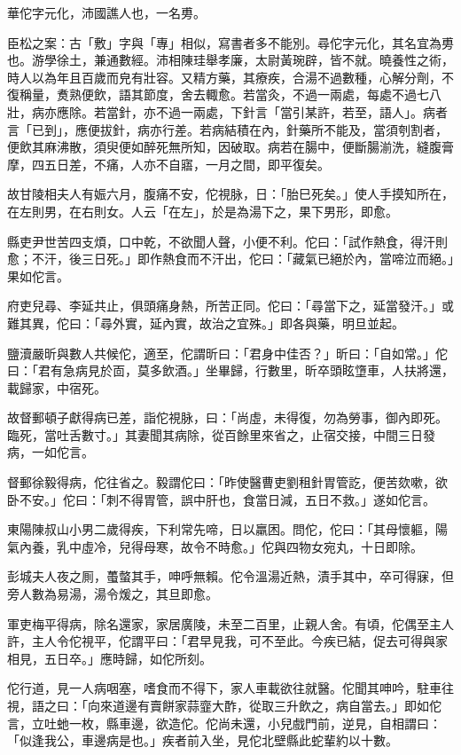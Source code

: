 
\begin{pinyinscope}
華佗字元化，沛國譙人也，一名旉。

臣松之案：古「敷」字與「專」相似，寫書者多不能別。尋佗字元化，其名宜為旉也。游學徐土，兼通數經。沛相陳珪舉孝廉，太尉黃琬辟，皆不就。曉養性之術，時人以為年且百歲而皃有壯容。又精方藥，其療疾，合湯不過數種，心解分劑，不復稱量，煑熟便飲，語其節度，舍去輙愈。若當灸，不過一兩處，每處不過七八壯，病亦應除。若當針，亦不過一兩處，下針言「當引某許，若至，語人」。病者言「已到」，應便拔針，病亦行差。若病結積在內，針藥所不能及，當須刳割者，便飲其麻沸散，須臾便如醉死無所知，因破取。病若在腸中，便斷腸湔洗，縫腹膏摩，四五日差，不痛，人亦不自寤，一月之間，即平復矣。

故甘陵相夫人有娠六月，腹痛不安，佗視脉，日：「胎巳死矣。」使人手摸知所在，在左則男，在右則女。人云「在左」，於是為湯下之，果下男形，即愈。

縣吏尹世苦四支煩，口中乾，不欲聞人聲，小便不利。佗曰：「試作熱食，得汗則愈；不汗，後三日死。」即作熱食而不汗出，佗曰：「藏氣已絕於內，當啼泣而絕。」果如佗言。

府吏兒尋、李延共止，俱頭痛身熱，所苦正同。佗曰：「尋當下之，延當發汗。」或難其異，佗曰：「尋外實，延內實，故治之宜殊。」即各與藥，明旦並起。

鹽瀆嚴昕與數人共候佗，適至，佗謂昕曰：「君身中佳否？」昕曰：「自如常。」佗曰：「君有急病見於靣，莫多飲酒。」坐畢歸，行數里，昕卒頭眩墯車，人扶將還，載歸家，中宿死。

故督郵頓子獻得病已差，詣佗視脉，曰：「尚虛，未得復，勿為勞事，御內即死。臨死，當吐舌數寸。」其妻聞其病除，從百餘里來省之，止宿交接，中間三日發病，一如佗言。

督郵徐毅得病，佗往省之。毅謂佗曰：「昨使醫曹吏劉租針胃管訖，便苦欬嗽，欲卧不安。」佗曰：「刺不得胃管，誤中肝也，食當日減，五日不救。」遂如佗言。

東陽陳叔山小男二歲得疾，下利常先啼，日以羸困。問佗，佗曰：「其母懷軀，陽氣內養，乳中虛冷，兒得母寒，故令不時愈。」佗與四物女宛丸，十日即除。

彭城夫人夜之厠，蠆螫其手，呻呼無賴。佗令溫湯近熱，漬手其中，卒可得寐，但旁人數為易湯，湯令煖之，其旦即愈。

軍吏梅平得病，除名還家，家居廣陵，未至二百里，止親人舍。有頃，佗偶至主人許，主人令佗視平，佗謂平曰：「君早見我，可不至此。今疾已結，促去可得與家相見，五日卒。」應時歸，如佗所刻。

佗行道，見一人病咽塞，嗜食而不得下，家人車載欲往就醫。佗聞其呻吟，駐車往視，語之曰：「向來道邊有賣餅家蒜韲大酢，從取三升飲之，病自當去。」即如佗言，立吐虵一枚，縣車邊，欲造佗。佗尚未還，小兒戲門前，逆見，自相謂曰：「似逢我公，車邊病是也。」疾者前入坐，見佗北壁縣此蛇輩約以十數。


\end{pinyinscope}
